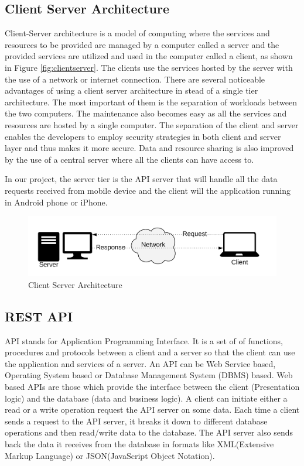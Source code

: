 \documentclass[12pt, a4paper, oneside]{article}
\begin{document}
\subsection{Client Server Architecture}
Client-Server architecture is a model of computing where the services and resources to be provided are managed by a computer called a server and the provided services are utilized and used in the computer called a client, as shown in Figure \ref{fig:clientserver}. The clients use the services hosted by the server with the use of a network or internet connection. There are several noticeable advantages of using a client server architecture in stead of a single tier architecture. The most important of them is the separation of workloads between the two computers. The maintenance also becomes easy as all the services and resources are hosted by a single computer. The separation of the client and server enables the developers to employ security strategies in both client and server layer and thus makes it more secure. Data and resource sharing is also improved by the use of a central server where all the clients can have access to.

In our project, the server tier is the API server that will handle all the data requests received from mobile device and the client will the application running in Android phone or iPhone.

\begin{figure}[H]
	\includegraphics[width=\linewidth]{client-server.png}
	\centering
	\caption{Client Server Architecture}
	\label{fig:clientsever}
\end{figure}


\subsection{REST API}
API stands for Application Programming Interface. It is a set of of functions, procedures and protocols between a client and a server so that the client can use the application and services of a server. An API can be Web Service based, Operating System based or Database Management System (DBMS) based. Web based APIs are those which provide the interface between the client (Presentation logic) and the database (data and business logic). A client can initiate either a read or a write operation request the API server on some data. Each time a client sends a request to the API server, it breaks it down to different database operations and then read/write data to the database. The API server also sends back the data it receives from the database in formats like XML(Extensive Markup Language) or JSON(JavaScript Object Notation).
\end{document}
